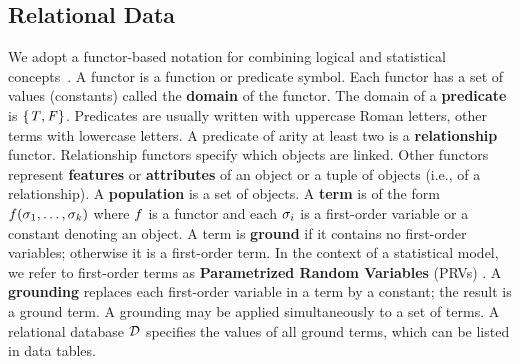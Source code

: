 \documentclass[conference]{IEEEtran}
\begin{document}
\subsection{Relational Data}





 We adopt a functor-based notation for combining logical and statistical concepts~\cite{Poole2003,Kimmig2014}.
A functor is a function or predicate symbol. Each functor has a set of values (constants) called the \textbf{domain} of the functor. The domain of a \textbf{predicate} is $\{\mathit{T},\mathit{F}\}$. Predicates are usually written with uppercase Roman letters, other terms with lowercase letters.
A predicate of arity at least two is a \textbf{relationship} functor. Relationship functors specify which objects are linked. Other functors represent \textbf{features} or \textbf{attributes} of an object or a tuple of objects (i.e., of a relationship).
A \textbf{population} is a set of objects. 
A \textbf{term} is of the form $f(\sigma_{1},\ldots,\sigma_{k})$ where $f$ is a functor %
and each $\sigma_{i}$ is a first-order variable or a constant denoting an object. A term is \textbf{ground} if it contains no first-order variables; otherwise it is a first-order term. In the context of a statistical model, we refer to first-order terms as \textbf{Parametrized Random Variables} (PRVs) \cite{Kimmig2014}. 
A \textbf{grounding} replaces each first-order variable in a term by a constant; the result is a ground term. A grounding may be applied simultaneously to a set of terms.  A relational database $\mathcal{D}$ specifies the values of all ground terms, which can be listed in data tables. 
\end{document}
